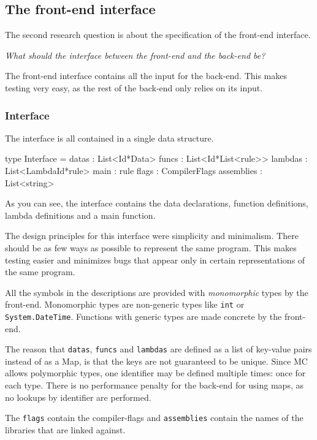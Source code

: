 \subsection{The front-end interface}
The second research question is about the specification of the front-end interface.

\textit{What should the interface between the front-end and the back-end be?}

The front-end interface contains all the input for the back-end.
This makes testing very easy, as the rest of the back-end only relies on its input.

\subsubsection{Interface}
The interface is all contained in a single data structure.

\begin{FS}
type Interface = {
  datas      : List<Id*Data>
  funcs      : List<Id*List<rule>>
  lambdas    : List<LambdaId*rule>
  main       : rule
  flags      : CompilerFlags
  assemblies : List<string> 
}
\end{FS}

As you can see, the interface contains the data declarations, function definitions, lambda definitions and a main function.

The design principles for this interface were simplicity and minimalism.
There should be as few ways as possible to represent the same program.
This makes testing easier and minimizes bugs that appear only in certain representations of the same program.

All the symbols in the descriptions are provided with \textit{monomorphic} types by the front-end.
Monomorphic types are non-generic types like \verb|int| or \verb|System|\verb|.DateTime|.
Functions with generic types are made concrete by the front-end.

The reason that \texttt{datas}, \texttt{funcs} and \texttt{lambdas} are defined as a list of key-value pairs instead of as a Map, is that the keys are not guaranteed to be unique.
Since MC allows polymorphic types, one identifier may be defined multiple times: once for each type.
There is no performance penalty for the back-end for using maps, as no lookups by identifier are performed.

The \verb|flags| contain the compiler-flags and \verb|assemblies| contain the names of the libraries that are linked against.

